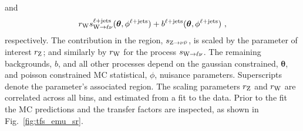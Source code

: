 %
and
%
\begin{equation}\label{eq:ellplusjets-expectation}
    r_{\PW}s_{\IWlv}^{\ellplusjets}(\bm{\theta},\phi^{\ellplusjets})%
    + b^{\ellplusjets}(\bm{\theta},\phi^{\ellplusjets})\ ,
\end{equation}
%
respectively. The \IZvv contribution in the \metplusjets region, $s_{{\mathrm{Z}\rightarrow\nu\bar{\nu}}}$,
is scaled by the parameter of interest $r_{\mathrm{Z}}$; and similarly by
$r_{\mathrm{W}}$ for the \IWlv process $s_{{\mathrm{W}\rightarrow \ell\nu}}$. The remaining backgrounds, $b$,
and all other processes depend on the gaussian constrained, $\bm{\theta}$, and
poisson constrained MC statistical, $\phi$, nuisance parameters. Superscripts
denote the parameter's associated region. The scaling parameters $r_\mathrm{Z}$ and
$r_\mathrm{W}$ are correlated across all \recoil bins, and estimated from a fit to
the data. Prior to the fit the MC predictions and the transfer factors are
inspected, as shown in Fig.~\ref{fig:tfs_emu_sr}.

